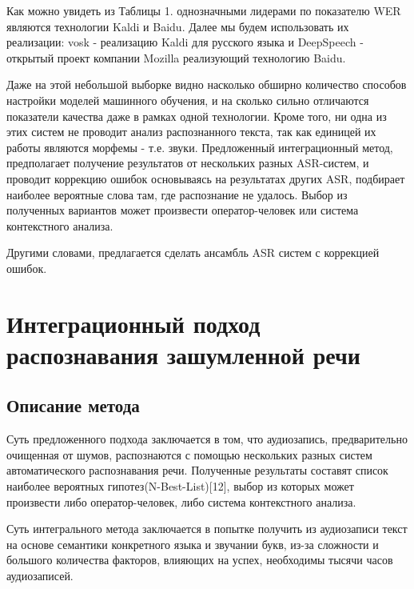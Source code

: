 \documentclass[conference]{IEEEtran}
\begin{document}
Как можно увидеть из Таблицы 1. однозначными лидерами по показателю WER являются технологии Kaldi и Baidu. Далее мы будем использовать их реализации: vosk - реализацию Kaldi для русского языка и DeepSpeech - открытый проект компании Mozilla реализующий технологию Baidu.

Даже на этой небольшой выборке видно насколько обширно количество способов настройки моделей машинного обучения, и на сколько сильно отличаются показатели качества даже в рамках одной технологии. Кроме того, ни одна из этих систем не проводит анализ распознанного текста, так как единицей их работы являются морфемы - т.е. звуки. Предложенный интеграционный метод, предполагает получение результатов от нескольких разных ASR-систем, и проводит коррекцию ошибок основываясь на результатах других ASR, подбирает наиболее вероятные слова там, где распознание не удалось. Выбор из полученных вариантов может произвести оператор-человек или система контекстного анализа.

Другими словами, предлагается сделать ансамбль ASR систем с коррекцией ошибок.

\section{Интеграционный подход распознавания зашумленной речи}
\subsection{Описание метода}
Суть предложенного подхода заключается в том, что аудиозапись, предварительно очищенная от шумов, распознаются с помощью нескольких разных систем автоматического распознавания речи. Полученные результаты составят список наиболее вероятных гипотез(N-Best-List)[12], выбор из которых может произвести либо оператор-человек, либо система контекстного анализа.

Суть интегрального метода заключается в попытке получить из аудиозаписи текст на основе семантики конкретного языка и звучании букв, из-за сложности и большого количества факторов, влияющих на успех, необходимы тысячи часов аудиозаписей.
\end{document}
